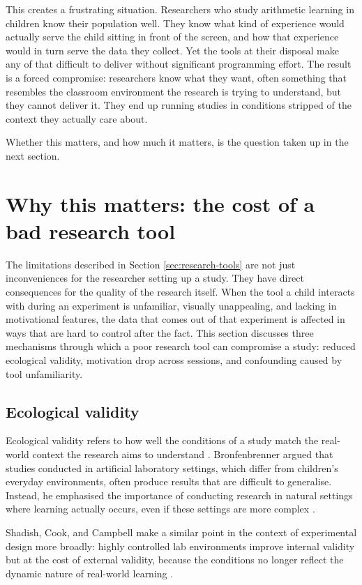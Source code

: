 This creates a frustrating situation. Researchers who study arithmetic learning in children know their population well. They know what kind of experience would actually serve the child sitting in front of the screen, and how that experience would in turn serve the data they collect. Yet the tools at their disposal make any of that difficult to deliver without significant programming effort. The result is a forced compromise: researchers know what they want, often something that resembles the classroom environment the research is trying to understand, but they cannot deliver it. They end up running studies in conditions stripped of the context they actually care about.

Whether this matters, and how much it matters, is the question taken up in the next section.

\section{Why this matters: the cost of a bad research tool}
\label{sec:why-this-matters}
The limitations described in Section \ref{sec:research-tools} are not just inconveniences for the researcher setting up a study. They have direct consequences for the quality of the research itself. When the tool a child interacts with during an experiment is unfamiliar, visually unappealing, and lacking in motivational features, the data that comes out of that experiment is affected in ways that are hard to control after the fact. This section discusses three mechanisms through which a poor research tool can compromise a study: reduced ecological validity, motivation drop across sessions, and confounding caused by tool unfamiliarity.

\subsection{Ecological validity}

Ecological validity refers to how well the conditions of a study match the real-world context the research aims to understand \cite{bronfenbrenner1977toward}. Bronfenbrenner argued that studies conducted in artificial laboratory settings, which differ from children's everyday environments, often produce results that are difficult to generalise. Instead, he emphasised the importance of conducting research in natural settings where learning actually occurs, even if these settings are more complex \cite{bronfenbrenner1977toward}.

Shadish, Cook, and Campbell make a similar point in the context of experimental design more broadly: highly controlled lab environments improve internal validity but at the cost of external validity, because the conditions no longer reflect the dynamic nature of real-world learning \cite{shadish2002experimental}.

